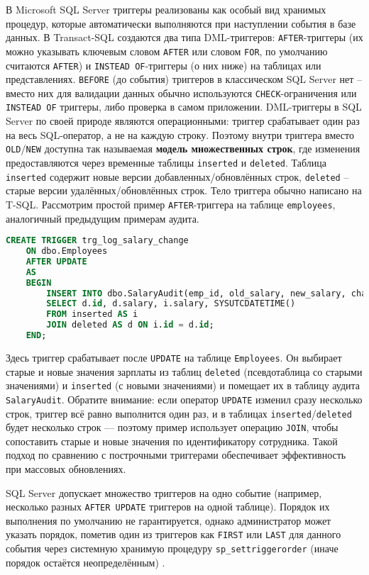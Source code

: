  В Microsoft SQL Server триггеры реализованы как особый вид хранимых процедур, которые автоматически выполняются при наступлении события в базе данных. В Transact-SQL создаются два типа DML-триггеров: \texttt{AFTER}-триггеры (их можно указывать ключевым словом \texttt{AFTER} или словом \texttt{FOR}, по умолчанию считаются \texttt{AFTER}) и \texttt{INSTEAD OF}-триггеры (о них ниже) на таблицах или представлениях. \texttt{BEFORE} (до события) триггеров в классическом SQL Server нет – вместо них для валидации данных обычно используются \texttt{CHECK}-ограничения или \texttt{INSTEAD OF} триггеры, либо проверка в самом приложении. DML-триггеры в SQL Server по своей природе являются операционными: триггер срабатывает один раз на весь SQL-оператор, а не на каждую строку. Поэтому внутри триггера вместо \texttt{OLD}/\texttt{NEW} доступна так называемая \textbf{модель множественных строк}, где изменения предоставляются через временные таблицы \texttt{inserted} и \texttt{deleted}. Таблица \texttt{inserted} содержит новые версии добавленных/обновлённых строк, \texttt{deleted} – старые версии удалённых/обновлённых строк. Тело триггера обычно написано на T-SQL. Рассмотрим простой пример \texttt{AFTER}-триггера на таблице \texttt{employees}, аналогичный предыдущим примерам аудита.

 \begin{lstlisting}[language=SQL]
    CREATE TRIGGER trg_log_salary_change
    ON dbo.Employees
    AFTER UPDATE
    AS
    BEGIN
        INSERT INTO dbo.SalaryAudit(emp_id, old_salary, new_salary, changed_at)
        SELECT d.id, d.salary, i.salary, SYSUTCDATETIME()
        FROM inserted AS i
        JOIN deleted AS d ON i.id = d.id;
    END;
 \end{lstlisting}

Здесь триггер срабатывает после \texttt{UPDATE} на таблице \texttt{Employees}. Он выбирает старые и новые значения зарплаты из таблиц \texttt{deleted} (псевдотаблица со старыми значениями) и \texttt{inserted} (с новыми значениями) и помещает их в таблицу аудита \texttt{SalaryAudit}. Обратите внимание: если оператор \texttt{UPDATE} изменил сразу несколько строк, триггер всё равно выполнится один раз, и в таблицах \texttt{inserted}/\texttt{deleted} будет несколько строк — поэтому пример использует операцию \texttt{JOIN}, чтобы сопоставить старые и новые значения по идентификатору сотрудника. Такой подход по сравнению с построчными триггерами обеспечивает эффективность при массовых обновлениях.

SQL Server допускает множество триггеров на одно событие (например, несколько разных \texttt{AFTER UPDATE} триггеров на одной таблице). Порядок их выполнения по умолчанию не гарантируется, однако администратор может указать порядок, пометив один из триггеров как \texttt{FIRST} или \texttt{LAST} для данного события через системную хранимую процедуру \texttt{sp\_settriggerorder} (иначе порядок остаётся неопределённым) \autocite{MicrosoftLearnDDLTrig}.

